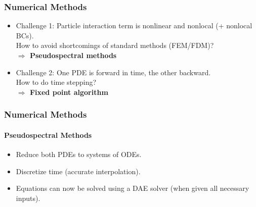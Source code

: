 \documentclass[aspectratio=169,xcolor=dvipsnames]{beamer}
\begin{document}
\begin{frame}
	\frametitle{Numerical Methods}

	\begin{itemize} 
		\item Challenge 1: Particle interaction term is nonlinear and nonlocal (+ nonlocal BCs).
		\\How to avoid shortcomings of standard methods (FEM/FDM)?\\
		\vspace{0.3 cm}		
		\textbf{$\Rightarrow$ Pseudospectral methods}		
		\vspace{0.2 cm}
		\item Challenge 2: One PDE is forward in time, the other backward. \\How to do time stepping?\\
		\vspace{0.3 cm}	
		\textbf{$\Rightarrow$ Fixed point algorithm}
	\end{itemize}

\end{frame}


\begin{frame}
	\frametitle{Numerical Methods}
	\framesubtitle{Pseudospectral Methods}
	\vspace{0.3 cm}
    \begin{itemize}
    	\item Reduce both PDEs to systems of ODEs.
    	\item Discretize time (accurate interpolation).
    	\item Equations can now be solved using a DAE solver (when given all necessary inputs).
    \end{itemize}
	
\end{frame}
\end{document}
